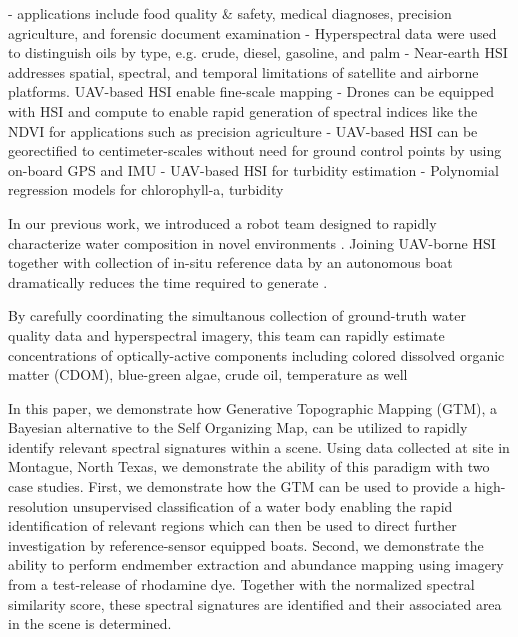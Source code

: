 \documentclass[remotesensing,article,submit,pdftex,moreauthors]{Definitions/mdpi}
\begin{document}
- applications include food quality & safety, medical diagnoses, precision agriculture, and forensic document examination \cite{khan2018modern}
- Hyperspectral data were used to distinguish oils by type, e.g. crude, diesel, gasoline, and palm \cite{yang2020characterization}
- Near-earth HSI addresses spatial, spectral, and temporal limitations of satellite and airborne platforms. UAV-based HSI enable fine-scale mapping \cite{banerjee2020uav}
- Drones can be equipped with HSI and compute to enable rapid generation of spectral indices like the NDVI for applications such as precision agriculture \cite{horstrand2019uav}
- UAV-based HSI can be georectified to centimeter-scales without need for ground control points by using on-board GPS and IMU \cite{arroyo2019implementation}
- UAV-based HSI for turbidity estimation \cite{vogt2016near}
- Polynomial regression models for chlorophyll-a, turbidity \cite{zhang2022selection}


In our previous work, we introduced a robot team designed to rapidly characterize water composition in novel environments \cite{robot-team-1}. 
Joining UAV-borne HSI together with collection of in-situ reference data by an autonomous boat dramatically reduces the time required to generate .

By carefully coordinating the simultanous collection of ground-truth water quality data and hyperspectral imagery, this team can rapidly estimate concentrations of optically-active components including colored dissolved organic matter (CDOM), blue-green algae, crude oil, temperature as well 

In this paper, we demonstrate how Generative Topographic Mapping (GTM), a Bayesian alternative to the Self Organizing Map, can be utilized to rapidly identify relevant spectral signatures within a scene. Using data collected at site in Montague, North Texas, we demonstrate the ability of this paradigm with two case studies. First, we demonstrate how the GTM can be used to provide a high-resolution unsupervised classification of a water body enabling the rapid identification of relevant regions which can then be used to direct further investigation by reference-sensor equipped boats. Second, we demonstrate the ability to perform endmember extraction and abundance mapping using imagery from a test-release of rhodamine dye. Together with the normalized spectral similarity score, these spectral signatures are identified and their associated area in the scene is determined.
\end{document}
